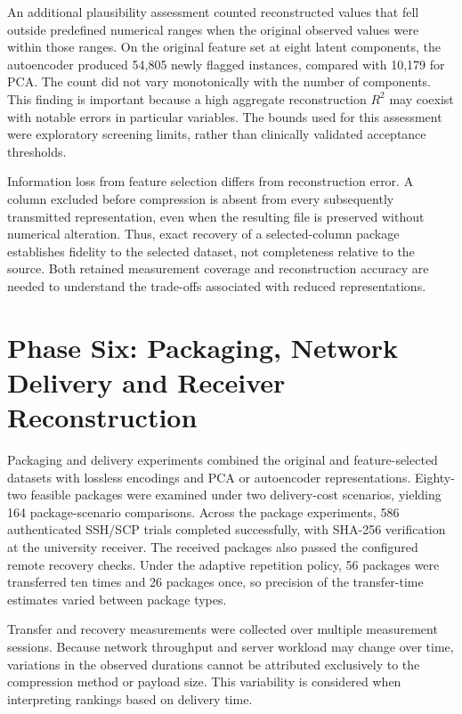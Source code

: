 An additional plausibility assessment counted reconstructed values that
fell outside predefined numerical ranges when the original observed
values were within those ranges. On the original feature set at eight
latent components, the autoencoder produced 54,805 newly flagged
instances, compared with 10,179 for PCA. The count did not vary
monotonically with the number of components. This finding is important
because a high aggregate reconstruction \(R^2\) may coexist with notable
errors in particular variables. The bounds used for this assessment were
exploratory screening limits, rather than clinically validated
acceptance thresholds.

Information loss from feature selection differs from reconstruction
error. A column excluded before compression is absent from every
subsequently transmitted representation, even when the resulting file is
preserved without numerical alteration. Thus, exact recovery of a
selected-column package establishes fidelity to the selected dataset,
not completeness relative to the source. Both retained measurement
coverage and reconstruction accuracy are needed to understand the
trade-offs associated with reduced representations.

\section{Phase Six: Packaging, Network Delivery and Receiver
	Reconstruction}\label{phase-six-packaging-network-delivery-and-receiver-reconstruction}

Packaging and delivery experiments combined the original and
feature-selected datasets with lossless encodings and PCA or autoencoder
representations. Eighty-two feasible packages were examined under two
delivery-cost scenarios, yielding 164 package-scenario comparisons.
Across the package experiments, 586 authenticated SSH/SCP trials
completed successfully, with SHA-256 verification at the university
receiver. The received packages also passed the configured remote
recovery checks. Under the adaptive repetition policy, 56 packages were
transferred ten times and 26 packages once, so precision of the
transfer-time estimates varied between package types.

Transfer and recovery measurements were collected over multiple
measurement sessions. Because network throughput and server workload may
change over time, variations in the observed durations cannot be
attributed exclusively to the compression method or payload size. This
variability is considered when interpreting rankings based on delivery
time.

